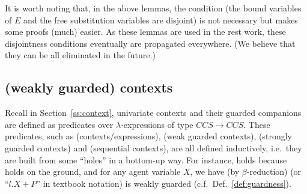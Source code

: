 It is worth noting that, in the above lemmas, the condition
 (the bound
variables of $E$ and the free substitution variables are disjoint) is
not necessary but makes some proofs (much) easier. As these lemmas are
used in the rest work, these disjointness conditions eventually
are propagated everywhere. (We believe that they can be
all eliminated in the future.)

\subsection{\Multivariate (weakly guarded) contexts}

Recall in Section~\ref{ss:context}, univariate contexts and their
guarded companions are defined as predicates over $\lambda$-expressions
of type $CCS\rightarrow CCS$. These predicates, such as
(contexts/expressions),  (weak guarded contexts),
 (strongly guarded contexts) and  (sequential
contexts), are all defined inductively, i.e.~they are built from some ``holes''
in a bottom-up way. For instance, 
holds because  holds on the ground,
and for any agent variable $X$, we have (by $\beta$-reduction)
 (or ``$l.X + P$'' in textbook
notation) is weakly guarded (c.f.~Def.~\ref{def:guardness}).

